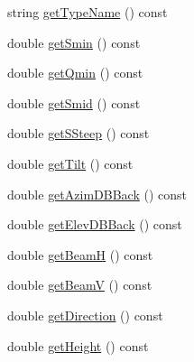 \begin{DoxyCompactItemize}
string \hyperlink{class_antenna_a40941201e4b272c4b9593e05aa1ac38e}{get\+Type\+Name} () const
\item 
double \hyperlink{class_antenna_a1955f59f9d3b20ffd8e79f4893bf2e61}{get\+Smin} () const
\item 
double \hyperlink{class_antenna_a67b245a43ba9d94ba4b7d3fdace7b73c}{get\+Qmin} () const
\item 
double \hyperlink{class_antenna_acfaf47d35cc742e76522ea31a8b01578}{get\+Smid} () const
\item 
double \hyperlink{class_antenna_a096deca0fe8497c0fe53539ae80f2db5}{get\+S\+Steep} () const
\item 
double \hyperlink{class_antenna_a9feaa77de0a608a7f59eb0854ae746a7}{get\+Tilt} () const
\item 
double \hyperlink{class_antenna_a1354b8be09c0985c3710a8c91ee11dd6}{get\+Azim\+D\+B\+Back} () const
\item 
double \hyperlink{class_antenna_ae4abdaeb483291d0e11cbcc393a0f6a3}{get\+Elev\+D\+B\+Back} () const
\item 
double \hyperlink{class_antenna_a5c1f0eaf769dae9172f450dbe8708be6}{get\+BeamH} () const
\item 
double \hyperlink{class_antenna_af3ce30dbc386b7d97e4ddc4c13356b85}{get\+BeamV} () const
\item 
double \hyperlink{class_antenna_a76d97c4f0e2b8ad00c1dbedc1710673c}{get\+Direction} () const
\item 
double \hyperlink{class_antenna_a04be1246cff927d077d62a82ed7eb25e}{get\+Height} () const
\end{DoxyCompactItemize}
